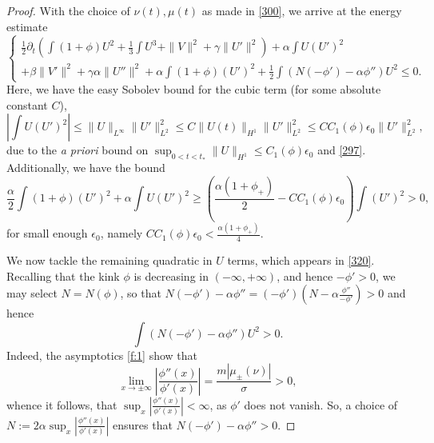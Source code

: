 \documentclass[12pt]{amsart}
\theoremstyle{definition}
\theoremstyle{remark}
\numberwithin{equation}{section}
\renewcommand{\(}{\left(}
\renewcommand{\)}{\right)}
\renewcommand{\[}{\left[}
\renewcommand{\]}{\right]}
\newcommand{\f}[2]{\frac{#1}{#2}}
\newcommand{\al}{\alpha}
\newcommand{\be}{\beta}
\newcommand{\ga}{\gamma}
\newcommand{\si}{\sigma}
\newcommand{\eps}{\epsilon}
\newcommand{\p}{\partial}
\begin{document}
\begin{proof}
% 
With the choice of $\nu(t), \mu(t)$ as made in \eqref{300},  we arrive at the energy estimate 
\begin{equation}
	\label{320} 
	\begin{cases}
		\f{1}{2}  \p_t\left( \int (1+ \phi) U^2+\f{1}{3} \int U^3+\|V\|^2+ \ga \|U'\|^2 \right) + \al \int  U (U')^2\\
		+  \be\|V'\|^2 +  \ga \al \|U''\|^2+ \al  \int (1+ \phi) (U')^2 +\f{1}{2}  \int  (N (-\phi') - \al \phi'')  U^2  \leq 0.
	\end{cases}
\end{equation} 
Here, we have the easy Sobolev bound for the cubic term (for some absolute constant $C$), 
$$
 \left|\int  U (U')^2\right|  \leq \|U\|_{L^\infty} \|U'\|_{L^2}^2\leq C \|U(t)\|_{H^1} \|U'\|_{L^2}^2\leq C  C_1(\phi) \eps_0\|U'\|_{L^2}^2,
$$
due to the {\it a priori} bound on $\sup_{0<t<t_*} \|U\|_{H^1}\leq C_1(\phi)\eps_0$ and \eqref{297}. 
Additionally, we have the bound 
$$
 \f{\al}{2}   \int (1+ \phi) (U')^2 +\al  \int  U (U')^2\geq  \left(\f{\al(1+\phi_+)}{2} -CC_1(\phi) \eps_0\right)  \int (U')^2 >0, 
$$
for small enough $\eps_0$, namely $CC_1(\phi) \eps_0<\f{\al(1+\phi_+)}{4} $. 

We now tackle the remaining quadratic in $U$ terms, which appears in \eqref{320}. 
 Recalling that the kink $\phi$ is decreasing in $(-\infty, +\infty)$, and hence $-\phi'>0$, we may select $N=N(\phi)$, so that $N (-\phi') - \al \phi''=(-\phi')\left(N-\al\f{\phi''}{-\phi'}\right)>0$ and hence $$
 \int  (N (-\phi') - \al \phi'')  U^2>0.
 $$
  Indeed, the asymptotics \eqref{f:1} show that 
$$
\lim_{x\to \pm \infty} \left|\frac{\phi''(x)}{\phi'(x)}\right|= \f{m|\mu_{\pm}(\nu)|}{\si}>0, 
$$
whence it follows,  that $\sup_{x} \left|\frac{\phi''(x)}{\phi'(x)}\right|<\infty$, as $\phi'$ does not vanish. So, a choice of $N:=2\al \sup_{x} \left|\frac{\phi''(x)}{\phi'(x)}\right|$ ensures that $N (-\phi') - \al \phi''>0$. 
 



\end{proof}
\end{document}
